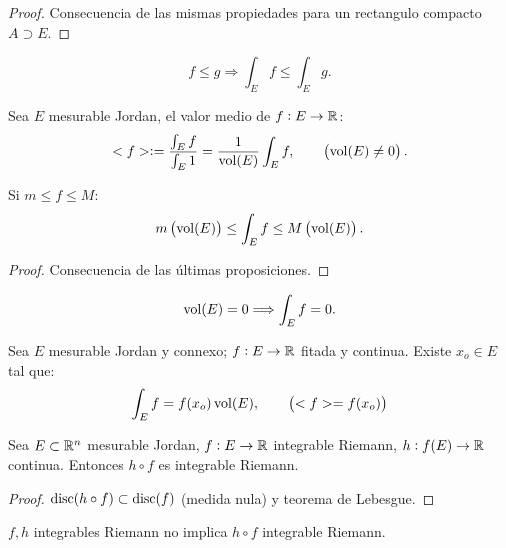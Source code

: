 \begin{proof}
    Consecuencia de las mismas propiedades para un rectangulo compacto $A \supset E$.
\end{proof}

\begin{col}[Monotonía]
    \[
    f \leq g \Longrightarrow \int_E f \leq \int_E g.
    \]
\end{col}

\begin{defi}
    Sea $E$ mesurable Jordan, el valor medio de $f : E \to \mathbb{R} $:
    \[
    <f> := \frac{\int_E f}{\int_E 1} = \frac{1}{\operatorname{vol}(E)} \int_E f, \qquad \left( \operatorname{vol}(E) \neq 0 \right).
    \]
\end{defi}

\begin{teo}
    Si $m \leq f \leq M$:
    \[
    m \left( \operatorname{vol}(E) \right) \leq \int_E f \leq M \left( \operatorname{vol}(E) \right).
    \]
\end{teo}

\begin{proof}
    Consecuencia de las últimas proposiciones.
\end{proof}

\begin{col}
    \[
    \operatorname{vol}(E) = 0 \Longrightarrow \int_E f = 0.
    \]
\end{col}

\begin{teo}
    Sea $E$ mesurable Jordan y connexo; $f : E \to \mathbb{R}$ fitada y continua. Existe $x_o \in E$ tal que:
    \[
    \int_E f = f(x_o) \operatorname{vol}(E), \qquad \left( <f> = f(x_o) \right)
    \]
\end{teo}

\begin{prop}
    Sea $E \subset \mathbb{R}^n$ mesurable Jordan, $f : E \to \mathbb{R}$ integrable Riemann, $h : f(E) \to \mathbb{R}$ continua. Entonces $h \circ f$ es integrable Riemann.
\end{prop}

\begin{proof}
    $\operatorname{disc}(h \circ f) \subset \operatorname{disc}(f)$ (medida nula) y teorema de Lebesgue.
\end{proof}

\begin{obs*}
    $f,h$ integrables Riemann no implica $h \circ f$ integrable Riemann.
\end{obs*}



